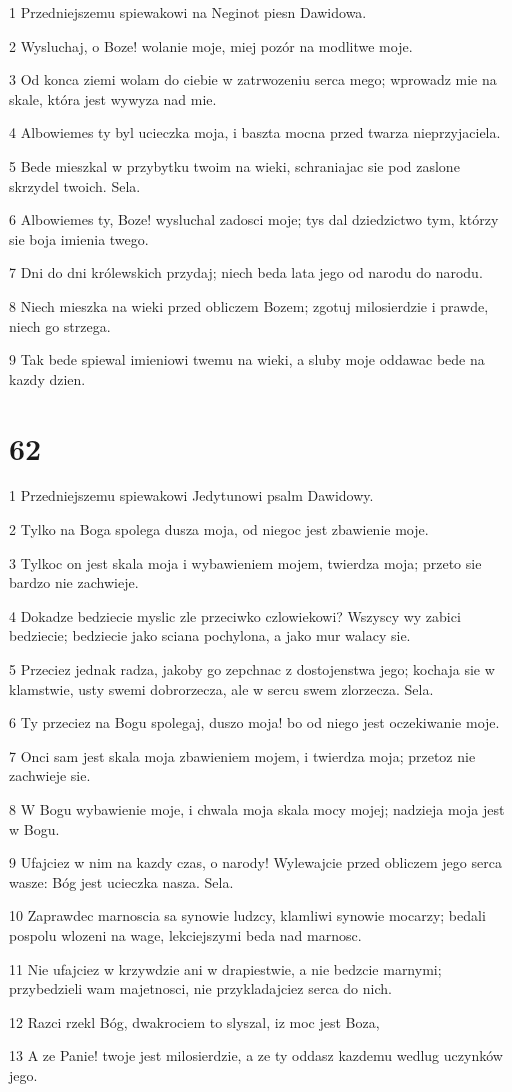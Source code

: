 \par 1 Przedniejszemu spiewakowi na Neginot piesn Dawidowa.
\par 2 Wysluchaj, o Boze! wolanie moje, miej pozór na modlitwe moje.
\par 3 Od konca ziemi wolam do ciebie w zatrwozeniu serca mego; wprowadz mie na skale, która jest wywyza nad mie.
\par 4 Albowiemes ty byl ucieczka moja, i baszta mocna przed twarza nieprzyjaciela.
\par 5 Bede mieszkal w przybytku twoim na wieki, schraniajac sie pod zaslone skrzydel twoich. Sela.
\par 6 Albowiemes ty, Boze! wysluchal zadosci moje; tys dal dziedzictwo tym, którzy sie boja imienia twego.
\par 7 Dni do dni królewskich przydaj; niech beda lata jego od narodu do narodu.
\par 8 Niech mieszka na wieki przed obliczem Bozem; zgotuj milosierdzie i prawde, niech go strzega.
\par 9 Tak bede spiewal imieniowi twemu na wieki, a sluby moje oddawac bede na kazdy dzien.

\chapter{62}

\par 1 Przedniejszemu spiewakowi Jedytunowi psalm Dawidowy.
\par 2 Tylko na Boga spolega dusza moja, od niegoc jest zbawienie moje.
\par 3 Tylkoc on jest skala moja i wybawieniem mojem, twierdza moja; przeto sie bardzo nie zachwieje.
\par 4 Dokadze bedziecie myslic zle przeciwko czlowiekowi? Wszyscy wy zabici bedziecie; bedziecie jako sciana pochylona, a jako mur walacy sie.
\par 5 Przeciez jednak radza, jakoby go zepchnac z dostojenstwa jego; kochaja sie w klamstwie, usty swemi dobrorzecza, ale w sercu swem zlorzecza. Sela.
\par 6 Ty przeciez na Bogu spolegaj, duszo moja! bo od niego jest oczekiwanie moje.
\par 7 Onci sam jest skala moja zbawieniem mojem, i twierdza moja; przetoz nie zachwieje sie.
\par 8 W Bogu wybawienie moje, i chwala moja skala mocy mojej; nadzieja moja jest w Bogu.
\par 9 Ufajciez w nim na kazdy czas, o narody! Wylewajcie przed obliczem jego serca wasze: Bóg jest ucieczka nasza. Sela.
\par 10 Zaprawdec marnoscia sa synowie ludzcy, klamliwi synowie mocarzy; bedali pospolu wlozeni na wage, lekciejszymi beda nad marnosc.
\par 11 Nie ufajciez w krzywdzie ani w drapiestwie, a nie bedzcie marnymi; przybedzieli wam majetnosci, nie przykladajciez serca do nich.
\par 12 Razci rzekl Bóg, dwakrociem to slyszal, iz moc jest Boza,
\par 13 A ze Panie! twoje jest milosierdzie, a ze ty oddasz kazdemu wedlug uczynków jego.

